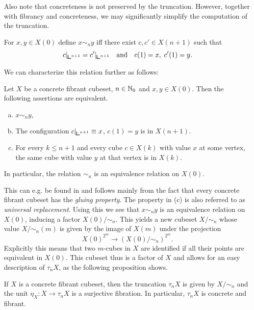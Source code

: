 Also note that concreteness is not preserved by the truncation.
However, together with fibrancy and concreteness, we may significantly simplify the computation of the truncation.

\begin{definition}\label{def:univ-replacement}
For $x,y\in X(0)$ define $x\sim_n y$ iff there exist $c,c'\in X(n+1)$ such that
\[
    c\rvert_{{\bbcor}^{n+1}} = c'\rvert_{{\bbcor}^{n+1}} \quad\text{and}\quad c(1) = x,\; c'(1) = y.
\]
\end{definition}

We can characterize this relation further as follows:

\begin{proposition}\label{prop:univ-replacement}
Let $X$ be a concrete fibrant cubeset, $n\in{\mathbb{N}}_0$ and $x,y\in X(0)$.
Then the following assertions are equivalent.
\begin{enumerate}[(a)]
    \item $x\sim_n y$,
    \item The configuration $c\rvert_{{\bbcor}^{n+1}} \equiv x$, $c(1) = y$ is in $X(n+1)$.
    \item For every $k\leq n+1$ and every cube $c\in X(k)$ with value $x$ at some vertex,
            the same cube with value $y$ at that vertex is in $X(k)$.
\end{enumerate}
In particular, the relation $\sim_n$ is an equivalence relation on $X(0)$.
\end{proposition}

This can e.g. be found in \cite{Gutman2020}
and follows mainly from the fact that every concrete fibrant cubeset has the \emph{gluing property}.
The property in (c) is also referred to as \emph{universal replacement}.
Using this we see that $x\sim_n y$ is an equivalence relation on $X(0)$, inducing a factor $X(0)/\sim_n$.
This yields a new cubeset $X/\sim_n$ whose value $X/\sim_n(m)$ is given by the image of $X(m)$ under the projection
\[
    X(0)^{2^m}\to (X(0)/\sim_n)^{2^m}.
\]
Explicitly this means that two $m$-cubes in $X$ are identified if all their points are equivalent in $X(0)$.
This cubeset thus is a factor of $X$ and allows for an easy description of $\tau_n X$, as the following proposition shows.

\begin{proposition}\label{prop:trunc_concfib}
If $X$ is a concrete fibrant cubeset, then the truncation $\tau_n X$ is given by $X/\sim_n$ and the unit
$\eta_X\colon X\to \tau_n X$ is a surjective fibration.
In particular, $\tau_n X$ is concrete and fibrant.
\end{proposition}

